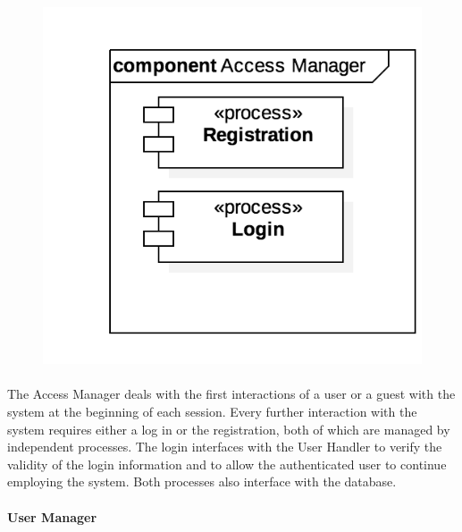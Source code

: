 			\begin{figure}[h]
				\includegraphics[scale=0.4, center]{img/component_diagrams/02_access_manager.png}
			\end{figure}
			
		\paragraph{}The Access Manager deals with the first interactions of a user or a guest with the system at the beginning of each session. Every further interaction with the system requires either a log in or the registration, both of which are managed by independent processes. The login interfaces with the User Handler to verify the validity of the login information and to allow the authenticated user to continue employing the system. Both processes also interface with the database.
\FloatBarrier
		
		
		
		
		\paragraph{User Manager}
		
